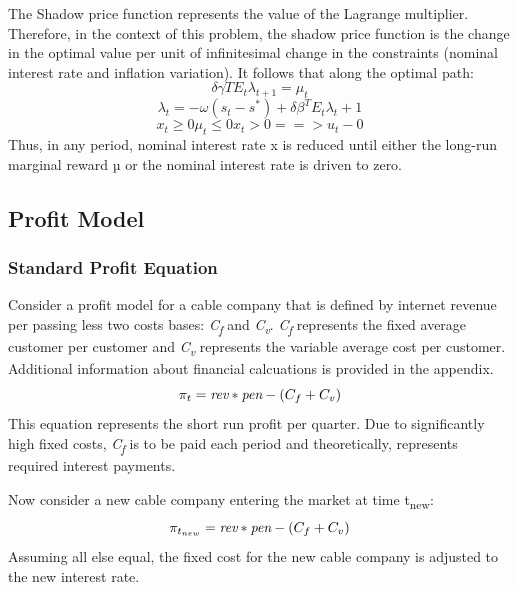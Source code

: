 \documentclass[a4paper,oneside]{article}
\begin{document}
The Shadow price function represents the value of the Lagrange multiplier. Therefore, in the context of this problem, the shadow price function is the change in the optimal value per unit of infinitesimal change in the constraints (nominal interest rate and inflation variation). 
It follows that along the optimal path:
  \begin{equation}
	  \delta \gamma TE_{t} \lambda_{t+1} = \mu_{t}
  \end{equation}
  \begin{equation}
	  \lambda_{t} = -\omega(s_{t}-s^{*})+\delta \beta^{T}E_{t} \lambda_{t}+1
  \end{equation}
  \begin{equation*}
	x_{t}\geq 0 \mu_{t} \leq 0 x_{t}>0 ==> u_{t} - 0
  \end{equation*}
  Thus, in any period, nominal interest rate x is reduced until either the long-run marginal reward  µ or the nominal interest rate is driven to zero. 

\subsection{Profit Model}

\subsubsection{Standard Profit Equation}
\:\:\:\:\:\: Consider a profit model for a cable company that is defined by internet revenue per passing less two costs bases: \emph{C\textsubscript{f}} and \emph{C\textsubscript{v}}. 
\emph{C\textsubscript{f}} represents the fixed average customer per customer and \emph{C\textsubscript{v}} represents the variable average cost per customer. 
Additional information about financial calcuations is provided in the appendix. 
\begin{equation}
	\pi_{t} = \emph{rev} * \emph{pen} - (C_{f}+C_{v})
\end{equation}
This equation represents the short run profit per quarter. 
Due to significantly high fixed costs, \emph{C\textsubscript{f}} is to be paid each period and theoretically, represents required interest payments.

Now consider a new cable company entering the market at time t\textsubscript{new}:
\begin{equation}
	\pi_{t_{new}} = \emph{rev} * \emph{pen} - (C_{f}+C_{v})
\end{equation}
Assuming all else equal, the fixed cost for the new cable company is adjusted to the new interest rate.
\end{document}
